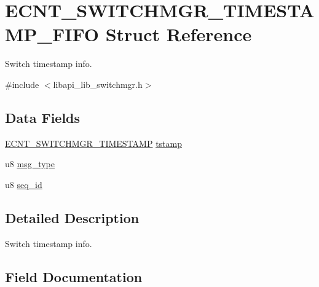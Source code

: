 \hypertarget{structECNT__SWITCHMGR__TIMESTAMP__FIFO}{}\section{E\+C\+N\+T\+\_\+\+S\+W\+I\+T\+C\+H\+M\+G\+R\+\_\+\+T\+I\+M\+E\+S\+T\+A\+M\+P\+\_\+\+F\+I\+FO Struct Reference}
\label{structECNT__SWITCHMGR__TIMESTAMP__FIFO}


Switch timestamp info.  




{\ttfamily \#include $<$libapi\+\_\+lib\+\_\+switchmgr.\+h$>$}

\subsection*{Data Fields}
\begin{DoxyCompactItemize}
\item 
\hyperlink{structECNT__SWITCHMGR__TIMESTAMP}{E\+C\+N\+T\+\_\+\+S\+W\+I\+T\+C\+H\+M\+G\+R\+\_\+\+T\+I\+M\+E\+S\+T\+A\+MP} \hyperlink{structECNT__SWITCHMGR__TIMESTAMP__FIFO_a288409e68dc423914e43461b5bd40e6c}{tstamp}
\item 
u8 \hyperlink{structECNT__SWITCHMGR__TIMESTAMP__FIFO_abecd4625b3c9e1eed5635efc6de146ed}{msg\+\_\+type}
\item 
u8 \hyperlink{structECNT__SWITCHMGR__TIMESTAMP__FIFO_ac44de78b94b20768499223b9ebb6efe7}{seq\+\_\+id}
\end{DoxyCompactItemize}


\subsection{Detailed Description}
Switch timestamp info. 

\subsection{Field Documentation}
\mbox{\label{structECNT__SWITCHMGR__TIMESTAMP__FIFO_abecd4625b3c9e1eed5635efc6de146ed}} 
